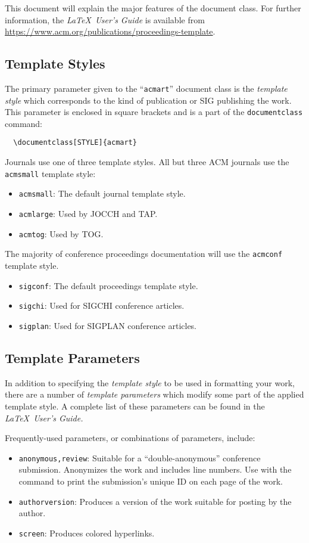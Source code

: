 \documentclass[sigconf,authordraft]{acmart}
\begin{document}
This document will explain the major features of the document
class. For further information, the {\itshape \LaTeX\ User's Guide} is
available from
\url{https://www.acm.org/publications/proceedings-template}.

\subsection{Template Styles}

The primary parameter given to the ``\verb|acmart|'' document class is
the {\itshape template style} which corresponds to the kind of publication
or SIG publishing the work. This parameter is enclosed in square
brackets and is a part of the {\verb|documentclass|} command:
\begin{verbatim}
  \documentclass[STYLE]{acmart}
\end{verbatim}

Journals use one of three template styles. All but three ACM journals
use the {\verb|acmsmall|} template style:
\begin{itemize}
\item {\texttt{acmsmall}}: The default journal template style.
\item {\texttt{acmlarge}}: Used by JOCCH and TAP.
\item {\texttt{acmtog}}: Used by TOG.
\end{itemize}

The majority of conference proceedings documentation will use the {\verb|acmconf|} template style.
\begin{itemize}
\item {\texttt{sigconf}}: The default proceedings template style.
\item{\texttt{sigchi}}: Used for SIGCHI conference articles.
\item{\texttt{sigplan}}: Used for SIGPLAN conference articles.
\end{itemize}

\subsection{Template Parameters}

In addition to specifying the {\itshape template style} to be used in
formatting your work, there are a number of {\itshape template parameters}
which modify some part of the applied template style. A complete list
of these parameters can be found in the {\itshape \LaTeX\ User's Guide.}

Frequently-used parameters, or combinations of parameters, include:
\begin{itemize}
\item {\texttt{anonymous,review}}: Suitable for a ``double-anonymous''
  conference submission. Anonymizes the work and includes line
  numbers. Use with the \texttt{\acmSubmissionID} command to print the
  submission's unique ID on each page of the work.
\item{\texttt{authorversion}}: Produces a version of the work suitable
  for posting by the author.
\item{\texttt{screen}}: Produces colored hyperlinks.
\end{itemize}
\end{document}
